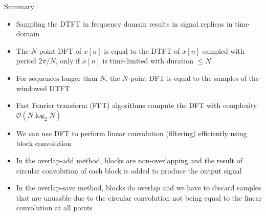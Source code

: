 \documentclass[10pt, aspectratio=169]{beamer}
\begin{document}
%
\begin{frame}{Summary}
	\begin{itemize}
		\item Sampling the DTFT in frequency domain results in signal replicas in time domain
		\item The $N$-point DFT of $x[n]$ is equal to the DTFT of $x[n]$ sampled with period $2\pi/N$, only if $x[n]$ is time-limited with duration $\leq N$
		\item For sequences longer than $N$, the $N$-point DFT is equal to the samples of the windowed DTFT
		\item Fast Fourier transform (FFT) algorithms compute the DFT with complexity $\mathcal{O}(N\log_2 N)$
		\item We can use DFT to perform linear convolution (filtering) efficiently using block convolution
		\item In the overlap-add method, blocks are non-overlapping and the result of circular convolution of each block is added to produce the output signal
		\item In the overlap-save method, blocks do overlap and we have to discard samples that are unusable due to the circular convolution not being equal to the linear convolution at all points
	\end{itemize}
\end{frame}
\end{document}
